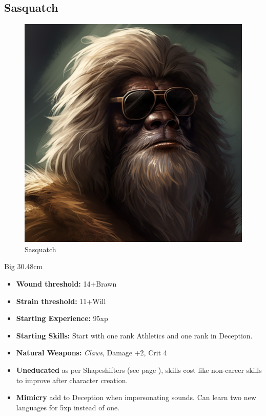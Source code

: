 \documentclass{book}
\begin{document}
\begin{multicols}{2}
	\subsection{Sasquatch}
	\begin{figure}[H]
		\centering
		\includegraphics[width=0.7\linewidth]{images/sasquatch}
		\caption{Sasquatch}
		\label{fig:sasquatch}
	\end{figure}
	
	Big 30.48cm
	
	\begin{itemize}
		\item \textbf{Wound threshold:} 14+Brawn
		\item \textbf{Strain threshold:} 11+Will
		\item \textbf{Starting Experience:} 95xp
		\item \textbf{Starting Skills:} Start with one rank Athletics and one rank in Deception.
		\item \textbf{Natural Weapons:} \textit{Claws}, Damage +2, Crit 4
		\item \textbf{Uneducated} as per Shapeshifters (see page \pageref{uneducated}), skills cost like non-career skills to improve after character creation.
		\item \textbf{Mimicry} add \BoostDie to Deception when impersonating sounds. Can learn two new languages for 5xp instead of one.
	\end{itemize}
\end{multicols}
\end{document}
